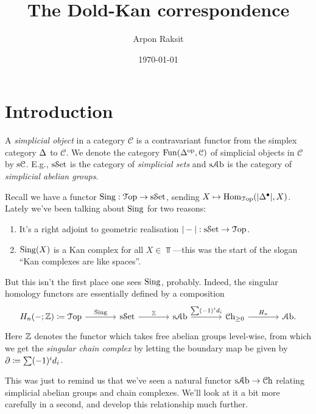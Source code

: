 


\title{The Dold-Kan correspondence}
\author{Arpon Raksit}
\date{\today}


\maketitle
\thispagestyle{fancy}


\renewcommand{\C}{\mathcal{C}}

\section{Introduction}

\begin{definition}
  A \textit{simplicial object} in a category $\C$ is a contravariant
  functor from the simplex category $\Delta$ to $\C$. We denote the
  category $\Fun(\Simplex^\op, \C)$ of simplicial objects in $\C$ by
  $\s\C$. E.g., $\mathrm{s}{\mathcal{S}\mathrm{et}}$ is the category of \textit{simplicial sets}
  and $\mathrm{s}{\mathcal{A}\mathrm{b}}$ is the category of \textit{simplicial abelian groups}.
\end{definition}

Recall we have a functor $\operatorname{Sing} : {\mathcal{T}\mathrm{op}} \to \mathrm{s}{\mathcal{S}\mathrm{et}}$, sending $X \mapsto
\operatorname{Hom}_{\mathcal{T}\mathrm{op}}(|\Delta^\bullet|, X)$. Lately we've been talking about
$\operatorname{Sing}$ for two reasons:
\begin{enumerate}
\item It's a right adjoint to geometric realisation $|-| : \mathrm{s}{\mathcal{S}\mathrm{et}} \to
  {\mathcal{T}\mathrm{op}}$.
\item $\operatorname{Sing}(X)$ is a Kan complex for all $X \in \Top$---this was the
  start of the slogan ``Kan complexes are like spaces''.
\end{enumerate}
But this isn't the first place one sees $\operatorname{Sing}$, probably. Indeed, the
singular homology functors are essentially defined by a composition
\[
\begin{tikzcd}[column sep = large]
  \H_n(-;\Z) \coloneqq \Top \rar{\Sing} & \s\Set \rar{\Z} & \s\Ab
  \rar{\sum (-1)^i d_i} & \Ch_{\ge 0} \rar{\H_n} & \Ab.
\end{tikzcd}
\]
Here $\mathbb{Z}$ denotes the functor which takes free abelian groups
level-wise, from which we get the \textit{singular chain complex} by
letting the boundary map be given by $\partial \coloneqq \sum (-1)^i d_i$.

This was just to remind us that we've seen a natural functor $\mathrm{s}{\mathcal{A}\mathrm{b}}
\to {\mathcal{C}\mathrm{h}}$ relating simplicial abelian groups and chain complexes. We'll
look at it a bit more carefully in a second, and develop this
relationship much further.

